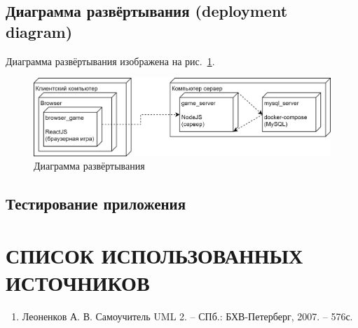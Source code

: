 \documentclass[12pt, a4paper, simple]{eskdtext}
\begin{document}
    \subsection{Диаграмма развёртывания (deployment diagram)}

    Диаграмма развёртывания изображена на рис.~\ref{fig:game__deployment_diagram}.

    \begin{figure}[!h]
        \centering
        \includegraphics[width=16cm]
            {../sources/game_architecture/build/game__deployment_diagram.png}
        \caption{Диаграмма развёртывания}
        \label{fig:game__deployment_diagram}
    \end{figure}

    \newpage
    \subsection{Тестирование приложения}
    \newpage

    \newpage
    \section*{СПИСОК ИСПОЛЬЗОВАННЫХ ИСТОЧНИКОВ}
    \begin{enumerate}
        \item[1.] Леоненков А. В.
        Самоучитель UML 2. -- СПб.: БХВ-Петерберг, 2007. -- 576с.
    \end{enumerate}
    \newpage
\end{document}

